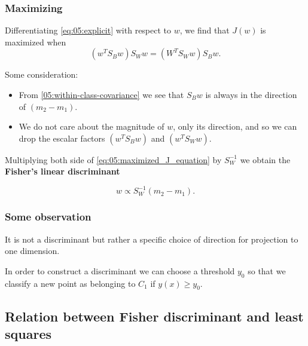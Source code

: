 \begin{frame}
    \frametitle{Maximizing}

    Differentiating \ref{eq:05:explicit} with respect to 
    $w$, we find that $J(w)$ is maximized when 
    \begin{equation}\label{eq:05:maximized_J_equation}
        (w^T S_B w)S_W w 
        = 
        (W^T S_W w) S_B w.
    \end{equation}

    Some consideration: 
    \begin{itemize}
        \item From \ref{05:within-class-covariance} we see that $S_B w$ is always in the direction of $(m_2 -m_1)$.
        \item We do not care about the magnitude of $w$, only its direction, and so we can drop the escalar factors $(w^T S_B w)$ and $(w^T S_W w)$. 
    \end{itemize}

    Multiplying both side of \ref{eq:05:maximized_J_equation} by $S^{-1}_W$ we obtain the \textbf{Fisher's linear discriminant}

    \begin{equation}
        w 
        \propto
        S^{-1}_W (m_2 - m_1).
    \end{equation}
\end{frame}

\begin{frame}
    \frametitle{Some observation }

    It is not a discriminant but rather 
    a specific choice of direction 
    for projection to one dimension. 
    
    In order to construct a discriminant we can 
    choose a threshold $y_0$ so that we classify a new point as belonging to 
    $C_1$ if $y(x) \geq y_0$. 
\end{frame}

\subsection{Relation between Fisher discriminant and least squares}

